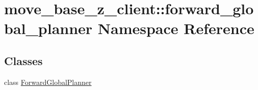 \hypertarget{namespacemove__base__z__client_1_1forward__global__planner}{}\section{move\+\_\+base\+\_\+z\+\_\+client\+:\+:forward\+\_\+global\+\_\+planner Namespace Reference}
\label{namespacemove__base__z__client_1_1forward__global__planner}
\subsection*{Classes}
\begin{DoxyCompactItemize}
\item 
class \hyperlink{classmove__base__z__client_1_1forward__global__planner_1_1ForwardGlobalPlanner}{Forward\+Global\+Planner}
\end{DoxyCompactItemize}
